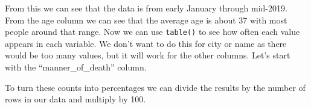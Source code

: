 \documentclass[
]{krantz}
\makeatletter
\newenvironment{Shaded}{\begin{snugshade}}{\end{snugshade}}
\newcommand{\CommentTok}[1]{\textcolor[rgb]{0.37,0.37,0.37}{\textit{#1}}}
\newcommand{\DecValTok}[1]{\textcolor[rgb]{0.06,0.06,0.06}{#1}}
\newcommand{\FunctionTok}[1]{\textcolor[rgb]{0,0,0}{#1}}
\newcommand{\NormalTok}[1]{#1}
\newcommand{\SpecialCharTok}[1]{\textcolor[rgb]{0,0,0}{#1}}
\newenvironment{kframe}{%
\medskip{}
\setlength{\fboxsep}{.8em}
 \def\at@end@of@kframe{}%
 \ifinner\ifhmode%
  \def\at@end@of@kframe{\end{minipage}}%
  \begin{minipage}{\columnwidth}%
 \fi\fi%
 \def\FrameCommand##1{\hskip\@totalleftmargin \hskip-\fboxsep
 \colorbox{shadecolor}{##1}\hskip-\fboxsep
     \hskip-\linewidth \hskip-\@totalleftmargin \hskip\columnwidth}%
 \MakeFramed {\advance\hsize-\width
   \@totalleftmargin\z@ \linewidth\hsize
   \@setminipage}}%
 {\par\unskip\endMakeFramed%
 \at@end@of@kframe}
\renewenvironment{Shaded}{\begin{kframe}}{\end{kframe}}
\makeatother
\begin{document}
\begin{Shaded}
\end{Shaded}

From this we can see that the data is from early January through mid-2019. From the age column we can see that the average age is about 37 with most people around that range. Now we can use \texttt{table()} to see how often each value appears in each variable. We don't want to do this for city or name as there would be too many values, but it will work for the other columns. Let's start with the ``manner\_of\_death'' column.

\begin{Shaded}
\end{Shaded}

To turn these counts into percentages we can divide the results by the number of rows in our data and multiply by 100.

\begin{Shaded}
\end{Shaded}
\end{document}
